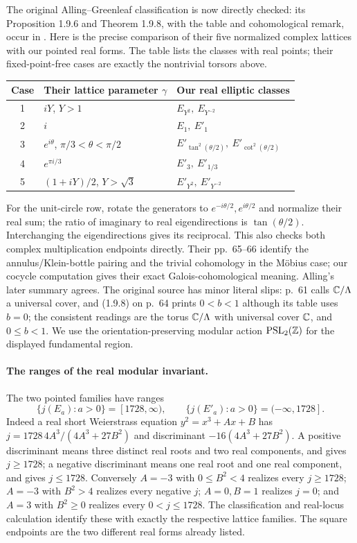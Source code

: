 The original Alling--Greenleaf classification is now directly checked: its Proposition 1.9.6 and Theorem 1.9.8, with the table and cohomological remark, occur in \cite[\S1.9, pp.~60--66]{AllingGreenleaf1971A567}. Here is the precise comparison of their five normalized complex lattices with our pointed real forms. The table lists the classes with real points; their fixed-point-free cases are exactly the nontrivial torsors above.
\begin{center}
\small
\begin{tabular}{cll}
Case & Their lattice parameter $\gamma$ & Our real elliptic classes\\ \hline
1 & $iY$, $Y>1$ & $E_{Y^2},\ E_{Y^{-2}}$\\
2 & $i$ & $E_1,\ E'_1$\\
3 & $e^{i\theta}$, $\pi/3<\theta<\pi/2$ & $E'_{\tan^2(\theta/2)},\ E'_{\cot^2(\theta/2)}$\\
4 & $e^{\pi i/3}$ & $E'_3,\ E'_{1/3}$\\
5 & $(1+iY)/2$, $Y>\sqrt3$ & $E'_{Y^2},\ E'_{Y^{-2}}$
\end{tabular}
\end{center}
For the unit-circle row, rotate the generators to $e^{-i\theta/2},e^{i\theta/2}$ and normalize their real sum; the ratio of imaginary to real eigendirections is $\tan(\theta/2)$. Interchanging the eigendirections gives its reciprocal. This also checks both complex multiplication endpoints directly. Their pp.~65--66 identify the annulus/Klein-bottle pairing and the trivial cohomology in the M\"obius case; our cocycle computation gives their exact Galois-cohomological meaning. Alling's later summary \cite[preface and \S0.10]{Alling1981A567} agrees. The original source has minor literal slips: p.~61 calls ${\mathbb{C}}/\Lambda$ a universal cover, and (1.9.8) on p.~64 prints $0<b<1$ although its table uses $b=0$; the consistent readings are the torus ${\mathbb{C}}/\Lambda$ with universal cover ${\mathbb{C}}$, and $0\le b<1$. We use the orientation-preserving modular action $\operatorname{PSL}_2({\mathbb{Z}})$ for the displayed fundamental region.

\paragraph{The ranges of the real modular invariant.}
The two pointed families have ranges
\[
 \{j(E_a):a>0\}=[1728,\infty),\qquad
 \{j(E'_a):a>0\}=(-\infty,1728].
\]
Indeed a real short Weierstrass equation $y^2=x^3+Ax+B$ has
$j=1728\,4A^3/(4A^3+27B^2)$ and discriminant
$-16(4A^3+27B^2)$. A positive discriminant means three distinct real roots and two real components, and gives $j\ge1728$; a negative discriminant means one real root and one real component, and gives $j\le1728$. Conversely $A=-3$ with $0\le B^2<4$ realizes every $j\ge1728$; $A=-3$ with $B^2>4$ realizes every negative $j$; $A=0,B=1$ realizes $j=0$; and $A=3$ with $B^2\ge0$ realizes every $0<j\le1728$. The classification and real-locus calculation identify these with exactly the respective lattice families. The square endpoints are the two different real forms already listed.
